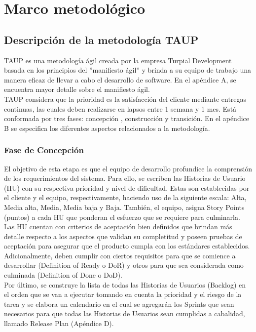 \chapter{\textbf{Marco metodológico}}

\thispagestyle{empty}

\section{Descripción de la metodología TAUP}

TAUP es una metodología ágil creada por la empresa Turpial Development basada en los principios del ”manifiesto ágil” y brinda a su equipo de trabajo una manera eficaz de llevar a cabo el desarrollo de software. En el apéndice A, se encuentra mayor detalle sobre el manifiesto ágil.\\

TAUP considera que la prioridad es la satisfacción del cliente mediante entregas continuas, las cuales deben realizarse en lapsos entre 1 semana y 1 mes. Está conformada por tres fases: concepción , construcción y transición. En el apéndice B se especifica los diferentes aspectos relacionados a la metodología.


\subsection{Fase de Concepción}

El objetivo de esta etapa es que el equipo de desarrollo profundice la comprensión de los requerimientos del sistema. Para ello, se escriben las Historias de Usuario (HU) con su respectiva prioridad y nivel de dificultad. Estas son establecidas por el cliente y el equipo, respectivamente, haciendo uso de la siguiente escala: Alta, Media alta, Media, Media baja y Baja. También, el equipo, asigna Story Points (puntos) a cada HU que ponderan el esfuerzo que se requiere para culminarla.\\

Las HU cuentan con criterios de aceptación bien definidos que brindan más detalle respecto a los aspectos que validan su completitud y poseen pruebas de aceptación para asegurar que el producto cumpla con los estándares establecidos. Adicionalmente, deben cumplir con ciertos requisitos para que se comience a desarrollar (Definition of Ready o DoR) y otros para que sea considerada como culminada (Definition of Done o DoD).\\

Por último, se construye la lista de todas las Historias de Usuarios (Backlog) en el orden que se van a ejecutar tomando en cuenta la prioridad y el riesgo de la tarea y se elabora un calendario en el cual se agregarán los Sprints que sean necesarios para que todas las Historias de Usuarios sean cumplidas a cabalidad, llamado Release Plan (Apéndice D).


